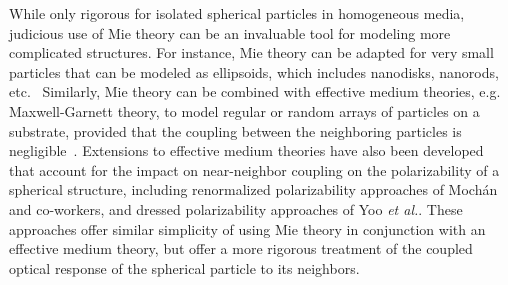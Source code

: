 \documentclass[10pt,letterpaper]{article}
\begin{document}
While only rigorous for 
isolated spherical particles in homogeneous media, judicious use of Mie theory can be an invaluable tool for modeling more complicated structures.  For instance, Mie theory can 
be adapted for very small particles that can be modeled as ellipsoids, which includes nanodisks, 
nanorods, etc.~\cite{Bohren}  Similarly, Mie theory 
can be combined with effective medium theories, e.g. Maxwell-Garnett theory, to model 
regular or random arrays of particles on a substrate, provided that the coupling 
between the neighboring particles is negligible~\cite{Bohren}.  
Extensions to effective medium theories have also
been developed that account for the impact on near-neighbor coupling on the 
polarizability of a spherical structure, 
including renormalized polarizability approaches of Moch\'{a}n and co-workers\cite{BCM_PRB_1988,BMM_PRB_1991}, and dressed
polarizability approaches of Yoo {\it et al.}\cite{YP_OptExpress_2012}.  These approaches offer similar simplicity of
using Mie theory in conjunction with an effective medium theory, but offer a more rigorous treatment of the coupled
optical response of the spherical particle to its neighbors. 
\end{document}
